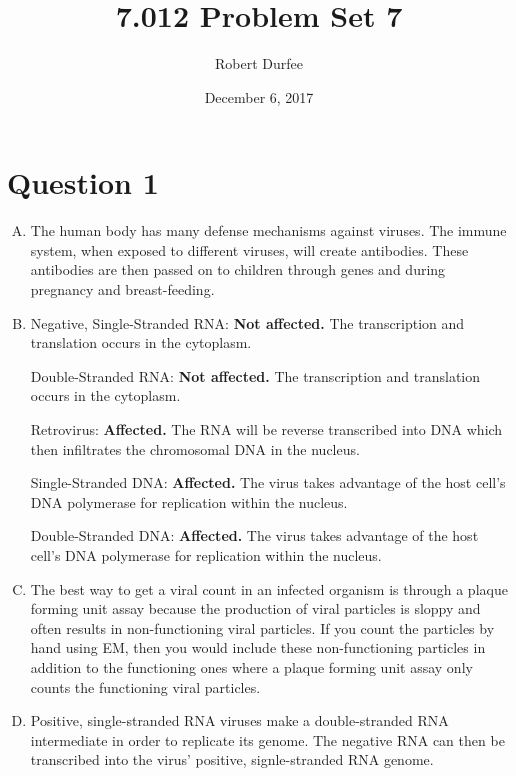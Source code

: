 \documentclass{article}
\title{ 7.012 Problem Set 7 }
\author{ Robert Durfee }
\date{ December 6, 2017 }
\begin{document}
\maketitle

\section*{ Question 1 }

\begin{enumerate}[A.]
    \item The human body has many defense mechanisms against viruses. The immune
        system, when exposed to different viruses, will create antibodies. These
        antibodies are then passed on to children through genes and during
        pregnancy and breast-feeding.

    \item Negative, Single-Stranded RNA: \textbf{Not affected.} The
        transcription and translation occurs in the cytoplasm.

        Double-Stranded RNA: \textbf{Not affected.} The transcription and
        translation occurs in the cytoplasm.
        
        Retrovirus: \textbf{Affected.} The RNA will be reverse transcribed into
        DNA which then infiltrates the chromosomal DNA in the nucleus.
       
        Single-Stranded DNA: \textbf{Affected.} The virus takes advantage of the
        host cell's DNA polymerase for replication within the nucleus.
       
        Double-Stranded DNA: \textbf{Affected.} The virus takes advantage of the
        host cell's DNA polymerase for replication within the nucleus.

    \item The best way to get a viral count in an infected organism is through a
        plaque forming unit assay because the production of viral particles is
        sloppy and often results in non-functioning viral particles. If you
        count the particles by hand using EM, then you would include these
        non-functioning particles in addition to the functioning ones where a
        plaque forming unit assay only counts the functioning viral particles.

    \item Positive, single-stranded RNA viruses make a double-stranded RNA
        intermediate in order to replicate its genome. The negative RNA can then
        be transcribed into the virus' positive, signle-stranded RNA genome.

\end{enumerate}
\end{document}
